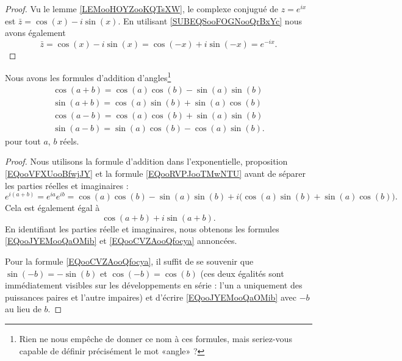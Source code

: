 \begin{proof}
	Vu le lemme \ref{LEMooHOYZooKQTsXW}, le complexe conjugué de \(  z=e^{ix}\) est \(\bar z= \cos(x)-i\sin(x)\). En utilisant \eqref{SUBEQSooFOGNooQrBxYc} nous avons également
	\begin{equation}
		\bar z=\cos(x)-i\sin(x)=\cos(-x)+i\sin(-x)= e^{-ix}.
	\end{equation}
\end{proof}

\begin{lemma}       \label{LEMooJAWBooJGfZIL}
	Nous avons les formules d'addition d'angles\footnote{Rien ne nous empêche de donner ce nom à ces formules, mais seriez-vous capable de définir précisément le mot «angle» ?}
	\begin{subequations}        \label{SUBEQSooFSSMooHcYwRc}
		\begin{align}
			\cos(a+b)=\cos(a)\cos(b)-\sin(a)\sin(b) \label{EQooJYEMooQaOMib} \\
			\sin(a+b)=\cos(a)\sin(b)+\sin(a)\cos(b) \label{EQooECAUooQzckDv} \\
			\cos(a-b)=\cos(a)\cos(b)+\sin(a)\sin(b) \label{EQooCVZAooQfocya} \\
			\sin(a-b)=\sin(a)\cos(b)-\cos(a)\sin(b).
		\end{align}
	\end{subequations}
	pour tout \( a\), \( b\) réels.
\end{lemma}

\begin{proof}
	Nous utilisons la formule d'addition dans l'exponentielle, proposition \eqref{EQooVFXUooBfwjJY} et la formule \eqref{EQooRVPJooTMwNTU} avant de séparer les parties réelles et imaginaires :
	\begin{equation}
		e^{i(a+b)}= e^{ia} e^{ib}=\cos(a)\cos(b)-\sin(a)\sin(b)+i\big( \cos(a)\sin(b)+\sin(a)\cos(b) \big).
	\end{equation}
	Cela est également égal à
	\begin{equation}
		\cos(a+b)+i\sin(a+b).
	\end{equation}
	En identifiant les parties réelle et imaginaires, nous obtenons les formules \eqref{EQooJYEMooQaOMib} et \eqref{EQooCVZAooQfocya} annoncées.

	Pour la formule \eqref{EQooCVZAooQfocya}, il suffit de se souvenir que \( \sin(-b)=-\sin(b)\) et \( \cos(-b)=\cos(b)\) (ces deux égalités sont immédiatement visibles sur les développements en série : l'un a uniquement des puissances paires et l'autre impaires) et d'écrire \eqref{EQooJYEMooQaOMib} avec \( -b\) au lieu de \( b\).
\end{proof}

